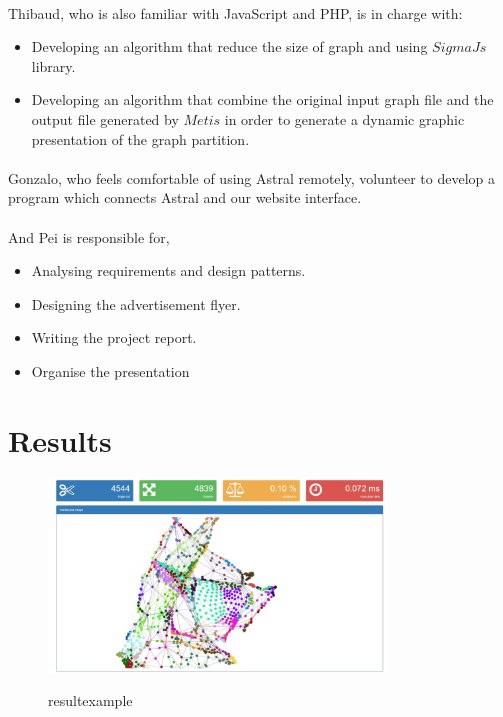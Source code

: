 \documentclass{cranfieldChart}
\begin{document}
\paragraph{}
Thibaud, who is also familiar with JavaScript and PHP, is in charge with: 
\begin{itemize}
    \item Developing an algorithm that reduce the size of graph and using $SigmaJs$ library.
    \item Developing an algorithm that combine the original input graph file and the output file generated by $Metis$ in order to generate a dynamic graphic presentation of the graph partition. 
\end{itemize}

\paragraph{}
Gonzalo, who feels comfortable of using Astral remotely, volunteer to develop a program which connects Astral and our website interface.

\paragraph{}
And Pei is responsible for, 
\begin{itemize}
    \item Analysing requirements and design patterns. 
    \item Designing the advertisement flyer.
    \item Writing  the project report.
    \item Organise the presentation 
\end{itemize}

\section{Results}

\begin{figure}[h!]
\centering
\includegraphics[width=0.8\textwidth]{ressources/graph}
\label{resultexample}
\caption{resultexample}
\end{figure}
\end{document}
